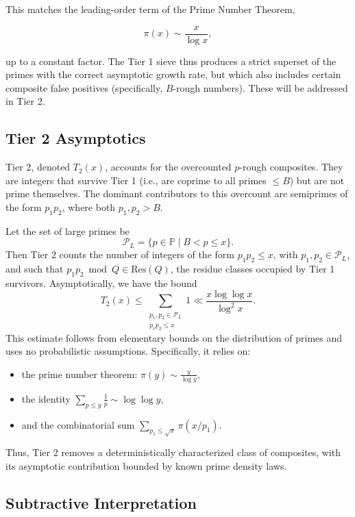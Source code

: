 \documentclass[11pt]{article}
\begin{document}
	This matches the leading-order term of the Prime Number Theorem,
	
	\[
	\pi(x) \sim \frac{x}{\log x},
	\]
	
	up to a constant factor. The Tier 1 sieve thus produces a strict superset of the primes with the correct asymptotic growth rate, but which also includes certain composite false positives (specifically, \( B \)-rough numbers). These will be addressed in Tier 2.


	
	\subsection{Tier 2 Asymptotics}
	
	Tier 2, denoted \( T_2(x) \), accounts for the overcounted $p$-rough composites. They are integers that survive Tier 1 (i.e., are coprime to all primes \( \leq B \)) but are not prime themselves. The dominant contributors to this overcount are semiprimes of the form \( p_1 p_2 \), where both \( p_1, p_2 > B \).
	
	Let the set of large primes be
	\[
	\mathcal{P}_L = \{ p \in \mathbb{P} \mid B < p \leq x \}.
	\]
	Then Tier 2 counts the number of integers of the form \( p_1 p_2 \leq x \), with \( p_1, p_2 \in \mathcal{P}_L \), and such that \( p_1 p_2 \bmod Q \in \text{Res}(Q) \), the residue classes occupied by Tier 1 survivors. Asymptotically, we have the bound
	\[
	T_2(x) \leq \sum_{\substack{p_1, p_2 \in \mathcal{P}_L \\ p_1 p_2 \leq x}} 1 \ll \frac{x \log\log x}{\log^2 x}.
	\]
	This estimate follows from elementary bounds on the distribution of primes and uses no probabilistic assumptions. Specifically, it relies on:
	
	\begin{itemize}
		\item the prime number theorem: \( \pi(y) \sim \frac{y}{\log y} \),
		\item the identity \( \sum_{p \leq y} \frac{1}{p} \sim \log\log y \),
		\item and the combinatorial sum \( \sum_{p_1 \leq \sqrt{x}} \pi(x / p_1) \).
	\end{itemize}
	
	Thus, Tier 2 removes a deterministically characterized class of composites, with its asymptotic contribution bounded by known prime density laws.
	
	\subsection{Subtractive Interpretation}
	
\end{document}
